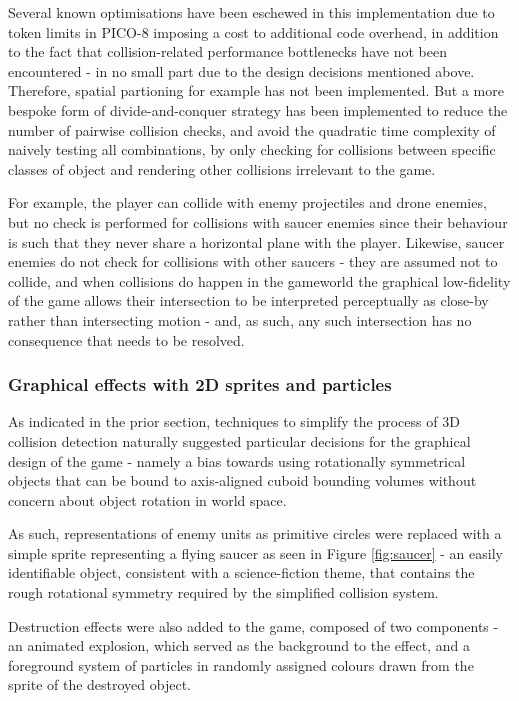 \documentclass{article}
\begin{document}
Several known optimisations have been eschewed in this implementation due to token limits in PICO-8
imposing a cost to additional code overhead, in addition to the fact that collision-related performance
bottlenecks have not been encountered - in no small part due to the design decisions mentioned above.
Therefore, spatial partioning for example has not been implemented. But a more bespoke form of divide-and-conquer
strategy has been implemented to reduce the number of pairwise collision checks, and avoid the quadratic
time complexity of naively testing all combinations, by only checking for collisions between specific
classes of object and rendering other collisions irrelevant to the game.

For example, the player can collide with enemy projectiles and drone enemies, but no check is performed
for collisions with saucer enemies since their behaviour is such that they never share a horizontal
plane with the player. Likewise, saucer enemies do not check for collisions with other saucers - they are 
assumed not to collide, and when collisions do happen in the gameworld the graphical low-fidelity of the
game allows their intersection to be interpreted perceptually as close-by rather than intersecting motion -
and, as such, any such intersection has no consequence that needs to be resolved.

\subsubsection*{Graphical effects with 2D sprites and particles}

As indicated in the prior section, techniques to simplify the process of 3D collision detection naturally
suggested particular decisions for the graphical design of the game - namely a bias towards using rotationally
symmetrical objects that can be bound to axis-aligned cuboid bounding volumes without concern about object
rotation in world space.

As such, representations of enemy units as primitive circles were replaced with a simple sprite representing
a flying saucer as seen in Figure \ref{fig:saucer} - an easily identifiable object, consistent with a science-fiction theme, that contains the
rough rotational symmetry required by the simplified collision system.

Destruction effects were also added to the game, composed of two components - an animated explosion, which
served as the background to the effect, and a foreground system of particles in randomly assigned colours
drawn from the sprite of the destroyed object.
\end{document}
